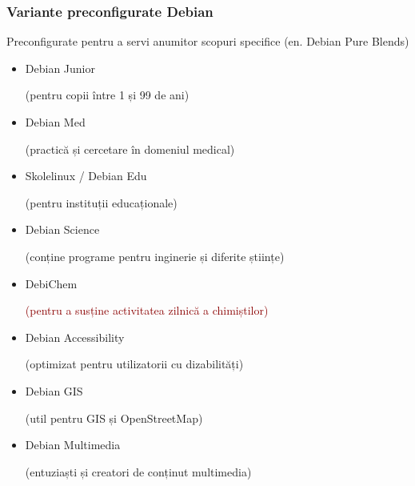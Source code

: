 \documentclass[xcolor=dvipsnames]{beamer}
\begin{document}
\begin{frame}
\frametitle{Variante preconfigurate Debian}
\begin{block}
{Preconfigurate pentru a servi anumitor scopuri specifice}
(en. Debian Pure Blends)\\
\begin{itemize}
\item Debian Junior
	\begin{footnotesize}
		(pentru copii între 1 și 99 de ani)
	\end{footnotesize} 
\item Debian Med
	\begin{footnotesize}
		(practică și cercetare în domeniul medical)
	\end{footnotesize} 
\item Skolelinux / Debian Edu
	\begin{footnotesize}
		(pentru instituții educaționale)
	\end{footnotesize} 
\item Debian Science
	\begin{footnotesize}
		(conține programe pentru inginerie și diferite științe)
	\end{footnotesize} 
\item DebiChem
	\begin{footnotesize}
		\textcolor{darkred}{(pentru a susține activitatea zilnică a chimiștilor)}
	\end{footnotesize} 
\item \textcolor{fade}{Debian Accessibility}
	\begin{footnotesize}
		\textcolor{fade}{(optimizat pentru utilizatorii cu dizabilități)}
	\end{footnotesize} 
\item \textcolor{fade}{Debian GIS}
	\begin{footnotesize}
		\textcolor{fade}{(util pentru GIS și OpenStreetMap)}
	\end{footnotesize} 
\item \textcolor{fade}{Debian Multimedia}
	\begin{footnotesize}
		\textcolor{fade}{(entuziaști și creatori de conținut multimedia)}
	\end{footnotesize} 
\end{itemize}
\end{block}
\end{frame}
\end{document}

